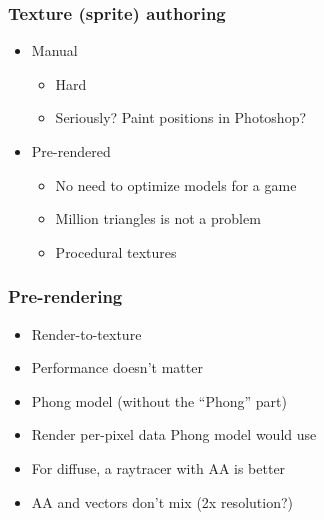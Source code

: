 \documentclass{beamer}
\begin{document}
\begin{frame}\frametitle{Texture (sprite) authoring}

\begin{itemize}
\item
  Manual

  \begin{itemize}
  \item
    Hard
  \item
    Seriously? Paint positions in Photoshop?
  \end{itemize}
\item
  Pre-rendered

  \begin{itemize}
  \item
    No need to optimize models for a game
  \item
    Million triangles is not a problem
  \item
    Procedural textures
  \end{itemize}
\end{itemize}

\end{frame}

\begin{frame}\frametitle{Pre-rendering}

\begin{itemize}
\item
  Render-to-texture
\item
  Performance doesn't matter
\item
  Phong model (without the ``Phong'' part)
\item
  Render per-pixel data Phong model would use
\item
  For diffuse, a raytracer with AA is better
\item
  AA and vectors don't mix (2x resolution?)
\end{itemize}

\end{frame}
\end{document}
